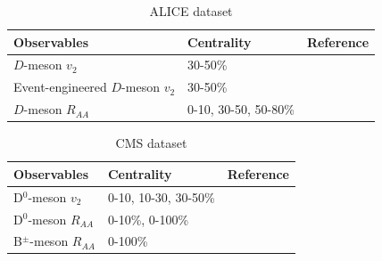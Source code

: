 \documentclass[aps, prc, reprint, amsmath, groupedaddress, nofootinbib]{revtex4-1}
\begin{document}
\begin{center}
\begin{table}[h]
\caption{ALICE dataset}\label{table:ALICE-obs} 
\begin{tabularx}{\columnwidth}{XXX}
\hline 
 Observables & Centrality & Reference\\ 
\hline 
$D$-meson $v_2$ & 30-50\% & \cite{Acharya:2017qps}\\ 
\hline 
Event-engineered $D$-meson $v_2$ & 30-50\% & \cite{Grosa:2017zcz}\\ 
\hline 
$D$-meson $R_{AA}$ & 0-10, 30-50, 50-80\% & \cite{Acharya:2018hre}\\
\hline 
\end{tabularx}
\end{table}
\begin{table}[h]
\caption{CMS dataset}\label{table:CMS-obs} 
\begin{tabularx}{\columnwidth}{XXX}
\hline 
Observables & Centrality & Reference\\ 
\hline 
D${}^0$-meson $v_2$ & 0-10, 10-30, 30-50\% & \cite{Sirunyan:2017plt}\\ 
\hline 
D${}^0$-meson $R_{AA}$ & 0-10\%, 0-100\% & \cite{Sirunyan:2017xss}\\ 
\hline 
B${}^{\pm}$-meson $R_{AA}$ & 0-100\% & \cite{Sirunyan:2017oug}\\ 
\hline 
\end{tabularx}
\end{table}
\end{center}
\end{document}
